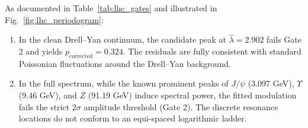 \documentclass[11pt,a4paper]{article}
\begin{document}
\begin{table}[htbp]
\centering
\caption{Audit of the Five Mandatory Integrity Gates on LHC Dimuon Residuals.}
\label{tab:lhc_gates}
\end{table}

As documented in Table~\ref{tab:lhc_gates} and illustrated in Fig.~\ref{fig:lhc_periodogram}:
\begin{enumerate}
    \item In the clean Drell--Yan continuum, the candidate peak at $\hat{\lambda} = 2.902$ fails Gate 2 and yields $p_{\text{corrected}} = 0.324$. The residuals are fully consistent with standard Poissonian fluctuations around the Drell--Yan background.
    \item In the full spectrum, while the known prominent peaks of $J/\psi$ (3.097 GeV), $\Upsilon$ (9.46 GeV), and $Z$ (91.19 GeV) induce spectral power, the fitted modulation fails the strict $2\sigma$ amplitude threshold (Gate 2). The discrete resonance locations do not conform to an equi-spaced logarithmic ladder.
\end{enumerate}
\end{document}
